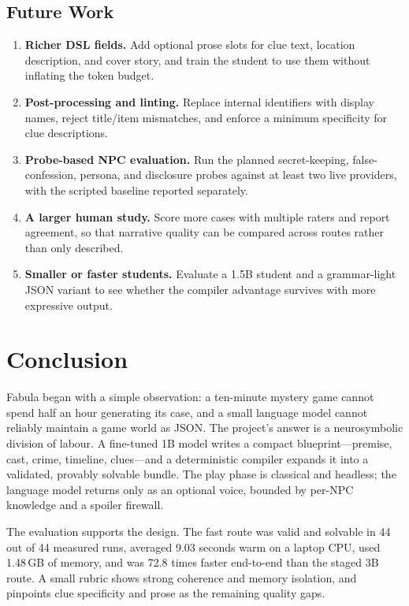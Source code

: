 ﻿\documentclass[11pt,a4paper]{report}
\begin{document}
\section{Future Work}
\begin{enumerate}
  \item \textbf{Richer DSL fields.} Add optional prose slots for clue text, location description, and cover story, and train the student to use them without inflating the token budget.
  \item \textbf{Post-processing and linting.} Replace internal identifiers with display names, reject title/item mismatches, and enforce a minimum specificity for clue descriptions.
  \item \textbf{Probe-based NPC evaluation.} Run the planned secret-keeping, false-confession, persona, and disclosure probes against at least two live providers, with the scripted baseline reported separately.
  \item \textbf{A larger human study.} Score more cases with multiple raters and report agreement, so that narrative quality can be compared across routes rather than only described.
  \item \textbf{Smaller or faster students.} Evaluate a 1.5B student and a grammar-light JSON variant to see whether the compiler advantage survives with more expressive output.
\end{enumerate}

\chapter{Conclusion}
\label{ch:conclusion}

Fabula began with a simple observation: a ten-minute mystery game cannot spend half an hour generating its case, and a small language model cannot reliably maintain a game world as JSON. The project's answer is a neurosymbolic division of labour. A fine-tuned 1B model writes a compact blueprint---premise, cast, crime, timeline, clues---and a deterministic compiler expands it into a validated, provably solvable bundle. The play phase is classical and headless; the language model returns only as an optional voice, bounded by per-NPC knowledge and a spoiler firewall.

The evaluation supports the design. The fast route was valid and solvable in 44 out of 44 measured runs, averaged 9.03 seconds warm on a laptop CPU, used 1.48\,GB of memory, and was 72.8 times faster end-to-end than the staged 3B route. A small rubric shows strong coherence and memory isolation, and pinpoints clue specificity and prose as the remaining quality gaps.
\end{document}
